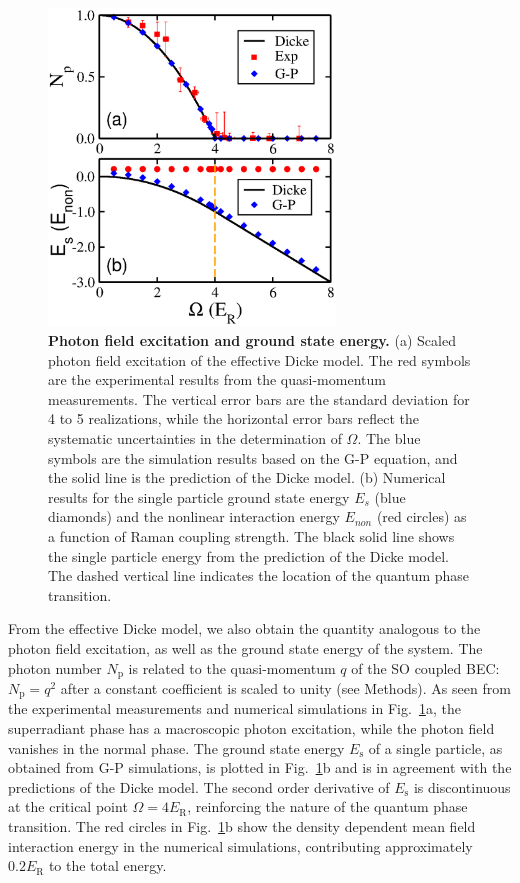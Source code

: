 \documentclass[prl,aps,twocolumn,floatfix]{revtex4}
\begin{document}
\begin{figure}[tbp]
\centering
\includegraphics[width=3.0in]{Figure-4Engels.eps}
\caption{\textbf{Photon field excitation and ground state energy.} (a)
Scaled photon field excitation of the effective Dicke model. The red symbols
are the experimental results from the quasi-momentum measurements. The
vertical error bars are the standard deviation for 4 to 5 realizations,
while the horizontal error bars reflect the systematic uncertainties in the
determination of $\Omega $. The blue symbols are the simulation results
based on the G-P equation, and the solid line is the prediction of the Dicke
model. (b) Numerical results for the single particle ground state energy $%
E_{s}$ (blue diamonds) and the nonlinear interaction energy $E_{non}$ (red circles) as
a function of Raman coupling strength. The black solid line shows
the single particle energy from the prediction of the Dicke model. The
dashed vertical line indicates the location of the quantum phase transition.}
\label{Fig4}
\end{figure}

From the effective Dicke model, we also obtain the quantity analogous to the
photon field excitation, as well as the ground state energy of the system.
The photon number $N_{\text{p}}$ is related to the quasi-momentum $q$ of the
SO coupled BEC: $N_{\text{p}}=q^{2}$ after a constant coefficient is scaled
to unity (see Methods). As seen from the experimental measurements and
numerical simulations in Fig.~\ref{Fig4}a, the superradiant phase has a
macroscopic photon excitation, while the photon field vanishes in the normal
phase. The ground state energy $E_{\text{s}}$ of a single particle, as
obtained from G-P simulations, is plotted in Fig.~\ref{Fig4}b and is in
agreement with the predictions of the Dicke model. The second order
derivative of $E_{\text{s}}$ is discontinuous at the critical point $\Omega
=4E_{\text{R}}$, reinforcing the nature of the quantum phase transition. The
red circles in Fig.~\ref{Fig4}b show the density dependent mean field
interaction energy in the numerical simulations, contributing approximately $%
0.2E_\text{R}$ to the total energy.
\end{document}
